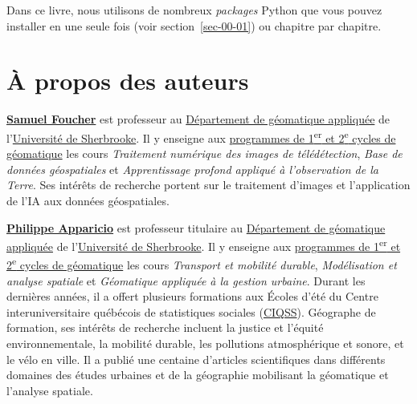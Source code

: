 \documentclass[
  french,
  11pt,
  letterpaper,
  open=any,
  twoside=false,
  french]{scrbook}
\begin{document}
Dans ce livre, nous utilisons de nombreux \emph{packages} Python que
vous pouvez installer en une seule fois (voir section~\ref{sec-00-01})
ou chapitre par chapitre.


\chapter*{À propos des auteurs}\label{auteurs}


\href{https://www.usherbrooke.ca/recherche/fr/specialistes/details/samuel.foucher}{\textbf{Samuel
Foucher}} est professeur au
\href{https://www.usherbrooke.ca/geomatique/}{Département de géomatique
appliquée} de l'\href{https://www.usherbrooke.ca/}{Université de
Sherbrooke}. Il y enseigne aux
\href{https://www.usherbrooke.ca/geomatique/etudes/programmes}{programmes
de 1\textsuperscript{er} et 2\textsuperscript{e} cycles de géomatique}
les cours \emph{Traitement numérique des images de télédétection},
\emph{Base de données géospatiales} et \emph{Apprentissage profond
appliqué à l'observation de la Terre}. Ses intérêts de recherche portent
sur le traitement d'images et l'application de l'IA aux données
géospatiales.

\href{https://www.usherbrooke.ca/recherche/fr/specialistes/details/philippe.apparicio}{\textbf{Philippe
Apparicio}} est professeur titulaire au
\href{https://www.usherbrooke.ca/geomatique/}{Département de géomatique
appliquée} de l'\href{https://www.usherbrooke.ca/}{Université de
Sherbrooke}. Il y enseigne aux
\href{https://www.usherbrooke.ca/geomatique/etudes/programmes}{programmes
de 1\textsuperscript{er} et 2\textsuperscript{e} cycles de géomatique}
les cours \emph{Transport et mobilité durable}, \emph{Modélisation et
analyse spatiale} et \emph{Géomatique appliquée à la gestion urbaine}.
Durant les dernières années, il a offert plusieurs formations aux Écoles
d'été du Centre interuniversitaire québécois de statistiques sociales
(\href{https://www.ciqss.org/}{CIQSS}). Géographe de formation, ses
intérêts de recherche incluent la justice et l'équité environnementale,
la mobilité durable, les pollutions atmosphérique et sonore, et le vélo
en ville. Il a publié une centaine d'articles scientifiques dans
différents domaines des études urbaines et de la géographie mobilisant
la géomatique et l'analyse spatiale.
\end{document}
